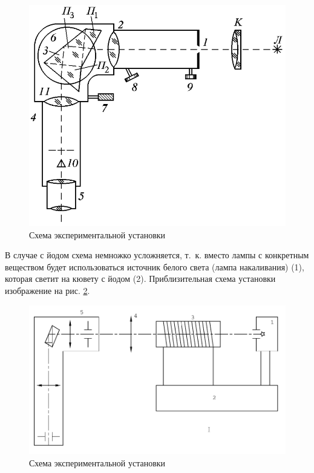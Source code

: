 \documentclass[a4paper, 12pt]{article}
\begin{document}
\begin{figure}[!h]
    \includegraphics[scale = 0.4]{Workplace1}
    \centering
    \caption{Схема экспериментальной установки}
    \label{img:work1}
\end{figure}

В случае с йодом схема немножко усложняется, т.~к. вместо лампы с конкретным веществом будет использоваться источник белого света (лампа накаливания) (1), которая светит на кювету с йодом (2). Приблизительная схема установки изображение на рис. \ref{img:work2}.

\begin{figure}[!h]
    \includegraphics[scale = 0.4]{Workplace2}
    \centering
    \caption{Схема экспериментальной установки}
    \label{img:work2}
\end{figure}
\end{document}
